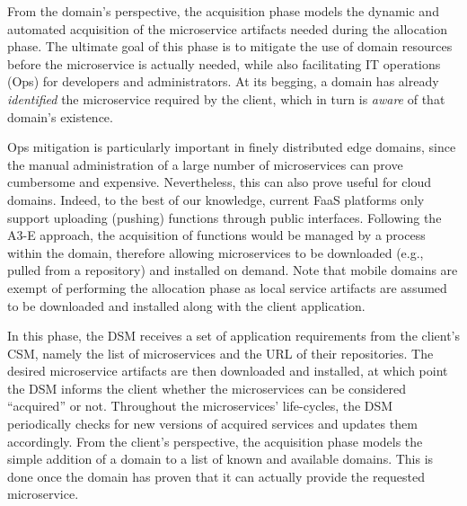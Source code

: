
From the domain's perspective, the acquisition phase models the dynamic and automated acquisition of the microservice artifacts needed during the allocation phase. 
The ultimate goal of this phase is to mitigate the use of domain resources before the microservice is actually needed, while also facilitating IT operations (Ops) for developers and administrators. At its begging, a domain has already \textit{identified} the microservice required by the client, which in turn is \textit{aware} of that domain's existence.

Ops mitigation is particularly important in finely distributed edge domains, since the manual administration of a large number of microservices can prove cumbersome and expensive. Nevertheless, this can also prove useful for cloud domains. Indeed, to the best of our knowledge, current FaaS platforms only support uploading (pushing) functions through public interfaces. Following the A3-E approach, the acquisition of functions would be managed by a process within the domain, therefore allowing microservices to be downloaded (e.g., pulled from a repository) and installed on demand. Note that mobile domains are exempt of performing the allocation phase as local service artifacts are assumed to be downloaded and installed along with the client application.


In this phase, the DSM receives a set of application requirements from the client's CSM, namely the list of microservices and the URL of their repositories. The desired microservice artifacts are then downloaded and installed, at which point the DSM informs the client whether the microservices can be considered ``acquired'' or not. 
Throughout the microservices' life-cycles, the DSM periodically checks for new versions of acquired services and updates them accordingly. 
From the client's perspective, the acquisition phase models the simple addition of a domain to a list of known and available domains. This is done once the domain has proven that it can actually provide the requested microservice. 


